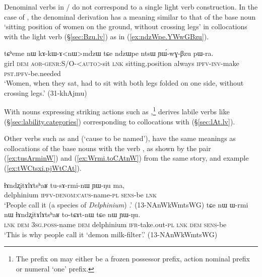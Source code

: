 Denominal verbs in / do not correspond to a single light verb construction. In the case of , the denominal derivation has a meaning similar to that of the base noun  `sitting position of women on the ground, without crossing legs' in collocations with the light verb  (§\ref{sec:Bzu.lv}) as in (\ref{ex:ndzWpe.YWwGBzu}).
\newpage
\begin{exe}
\ex \label{ex:ndzWpe.YWwGBzu}
 \gll tɕʰeme nɯ kɤ-kɯ-ɤ<nɯ>mdzɯ tɕe ndzɯpe ntsɯ ɲɯ́-wɣ-βzu pɯ-ra. \\
 girl \textsc{dem} \textsc{aor}-\textsc{genr}:S/O-<\textsc{auto}>sit \textsc{lnk} sitting.position always \textsc{ipfv}-\textsc{inv}-make \textsc{pst}.\textsc{ipfv}-be.needed \\
 \glt `Women, when they sat, had to sit with both legs folded on one side, without crossing legs.' (31-khAjmu)
\end{exe}

With nouns expressing striking actions such as ,\footnote{The  prefix on   may either be a frozen possessor prefix, action nominal prefix or numeral `one' prefix. }   derives labile verbs like  (§\ref{sec:lability.categories}) corresponding to collocations with  (§\ref{sec:lAt.lv}).


Other verbs such as  and  (`cause to be named'), have the same meanings as collocations of the base nouns with the verb , as shown by the pair  (\ref{ex:tusArminW}) and (\ref{ex:Wrmi.toCAtnW}) from the same story, and example (\ref{ex:tWCtsxi.pjWtCAt}).

\begin{exe}
\ex 
\begin{xlist}
\ex \label{ex:tusArminW}
 \gll ɬɤndʐitɤlɤtsʰaʁ tu-sɤ-rmi-nɯ ɲɯ-ŋu ma, \\
 delphinium \textsc{ipfv}-\textsc{denom}:\textsc{caus}-name-\textsc{pl} \textsc{sens}-be \textsc{lnk} \\
\glt `People call it (a species of \textit{Delphinium})  .' (13-NAnWkWmtsWG)
\ex \label{ex:Wrmi.toCAtnW}
 \gll  tɕe nɯ ɯ-rmi nɯ ɬɤndʐitɤlɤtsʰaʁ to-tɕɤt-nɯ tɕe nɯ ɲɯ-ŋu. \\
 \textsc{lnk} \textsc{dem} \textsc{3sg}.\textsc{poss}-name \textsc{dem} delphinium \textsc{ifr}-take.out-\textsc{pl} \textsc{lnk} \textsc{dem} \textsc{sens}-be \\
\glt `This is why people call it  `demon milk-filter'.' (13-NAnWkWmtsWG)
\end{xlist}
\end{exe}

